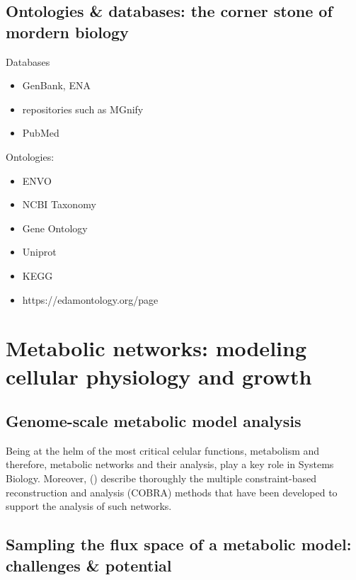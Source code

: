 \subsection{Ontologies \& databases: the corner stone of mordern biology}


   Databases

   \begin{itemize}
      \item GenBank, ENA
      \item repositories such as MGnify 
      \item PubMed
   \end{itemize}


   Ontologies: 

   \begin{itemize}
      \item ENVO
      \item NCBI Taxonomy 
      \item Gene Ontology 
      \item Uniprot
      \item KEGG
      \item https://edamontology.org/page
   \end{itemize}



\section{Metabolic networks: modeling  cellular physiology and growth}

   \subsection{Genome-scale metabolic model analysis}



      Being at the helm of the most critical celular functions, 
      metabolism and therefore, metabolic networks and their analysis, 
      play a key role in Systems Biology. 
      Moreover, \citeauthor{lewis2012constraining} (\citeyear{lewis2012constraining}) 
      describe thoroughly the multiple constraint-based reconstruction and analysis (COBRA) methods 
      that have been developed to support the analysis of such networks. 
   \subsection{Sampling the flux space of a metabolic model: challenges \& potential}




